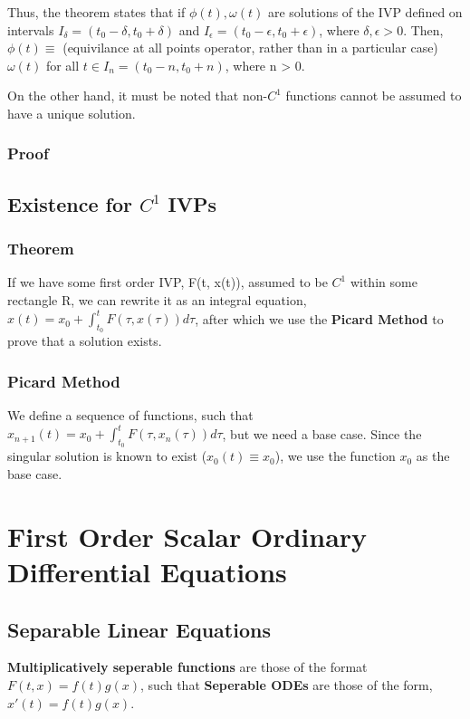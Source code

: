 \documentclass[11 pt, twoside]{article}
\begin{document}
Thus, the theorem states that if $\phi(t), \omega(t)$ are solutions of the IVP defined on intervals $I_\delta = (t_0 - \delta, t_0 + \delta)$ and $I_\epsilon = (t_0 - \epsilon, t_0 + \epsilon)$, where $\delta, \epsilon > 0$. Then, $\phi(t) \equiv$ (equivilance at all points operator, rather than in a particular case) $\omega(t)$ for all $t \in I_n = (t_0 - n, t_0 + n)$, where n > 0.

On the other hand, it must be noted that non-$C^1$ functions cannot be assumed to have a unique solution.

\subsubsection{Proof}
\subsection{Existence for $C^1$ IVPs}
\subsubsection{Theorem}
If we have some first order IVP, F(t, x(t)), assumed to be $C^1$ within some rectangle R, we can rewrite it as an integral equation, $x(t) = x_0 + \int^t_{t_0} F(\tau, x(\tau))d\tau$, after which we use the \textbf{Picard Method} to prove that a solution exists.

\subsubsection{Picard Method}
We define a sequence of functions, such that $x_{n+1}(t) = x_0 + \int_{t_0}^t F(\tau, x_n(\tau))d\tau$, but we need a base case. Since the singular solution is known to exist ($x_0(t) \equiv x_0$), we use the function $x_0$ as the base case. 



\section{First Order Scalar Ordinary Differential Equations}
\subsection{Separable Linear Equations}
\textbf{Multiplicatively seperable functions} are those of the format $F(t, x) = f(t)g(x)$, such that \textbf{Seperable ODEs} are those of the form, $x'(t) = f(t)g(x)$.
\end{document}
